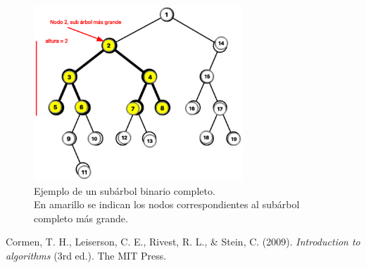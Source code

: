 \documentclass[12pt]{article}
\begin{document}
\begin{figure}[H]
    \centering
    \includegraphics[width=0.7\textwidth]{subárbol.png}
    \caption{Ejemplo de un subárbol binario completo.\\
    En amarillo se indican los nodos correspondientes al subárbol completo más grande.}
\end{figure}

\begin{thebibliography}{99}
    Cormen, T. H., Leiserson, C. E., Rivest, R. L., \& Stein, C. (2009). \textit{Introduction to algorithms} (3rd ed.). The MIT Press.
\end{thebibliography}
\end{document}
